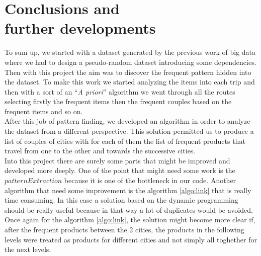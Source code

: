 \documentclass{acm_proc_article-sp-sigmod09}
\begin{document}
	\section{Conclusions and \\further developments}
	To sum up, we started with a dataset generated by the previous work of big data where we had to design a pseudo-random dataset introducing some dependencies. Then with this project the aim was to discover the frequent pattern hidden into the dataset. To make this work we started analyzing the items into each trip and then with a sort of an ``\textit{A priori}'' algorithm we went through all the routes selecting firstly the frequent items then the frequent couples based on the frequent items and so on.\\ 
	After this job of pattern finding, we developed an algorithm in order to analyze the dataset from a different perspective. This solution permitted us to produce a list of couples of cities with for each of them the list of frequent products that travel from one to the other and towards the successive cities.\\
	Into this project there are surely some parts that might be improved and developed more deeply. One of the point that might need some work is the $patternExtraction$ because it is one of the bottleneck in our code. Another algorithm that need some improvement is the algorithm \ref{algo:link} that is really time consuming. In this case a solution based on the dynamic programming should be really useful because in that way a lot of duplicates would be avoided. Once again for the algorithm \ref{algo:link}, the solution might become more clear if, after the frequent products between the 2 cities, the products in the following levels were treated as products for different cities and not simply all toghether for the next levels.
\end{document}
